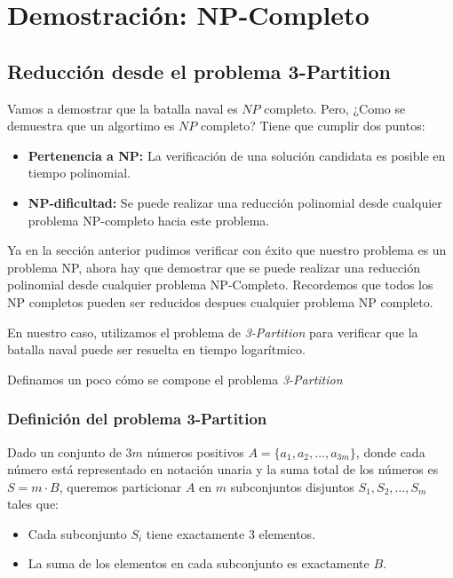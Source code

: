 \section{Demostración: NP-Completo}


\subsection*{Reducción desde el problema 3-Partition}

Vamos a demostrar que la batalla naval es $NP$ completo. Pero, ¿Como se demuestra que un algortimo es $NP$ completo? Tiene que cumplir dos puntos: 

\begin{itemize}
    \item \textbf{Pertenencia a NP:} La verificación de una solución candidata es posible en tiempo polinomial.
    \item \textbf{NP-dificultad:} Se puede realizar una reducción polinomial desde cualquier problema NP-completo hacia este problema.
\end{itemize}

Ya en la sección anterior pudimos verificar con éxito que nuestro problema es un problema NP, ahora hay que demostrar que se puede realizar una reducción polinomial desde cualquier problema NP-Completo. Recordemos que todos los NP completos pueden ser reducidos despues cualquier problema NP completo. 

En nuestro caso, utilizamos el problema de \textit{3-Partition} para verificar que la batalla naval puede ser resuelta en tiempo logarítmico.


Definamos un poco cómo se compone el problema \textit{3-Partition}



\subsubsection*{Definición del problema 3-Partition}

Dado un conjunto de \(3m\) números positivos \(A = \{a_1, a_2, \dots, a_{3m}\}\), donde cada número está representado en notación unaria y la suma total de los números es \(S = m \cdot B\), queremos particionar \(A\) en \(m\) subconjuntos disjuntos \(S_1, S_2, \dots, S_m\) tales que:
\begin{itemize}
    \item Cada subconjunto \(S_i\) tiene exactamente 3 elementos.
    \item La suma de los elementos en cada subconjunto es exactamente \(B\).
\end{itemize}

